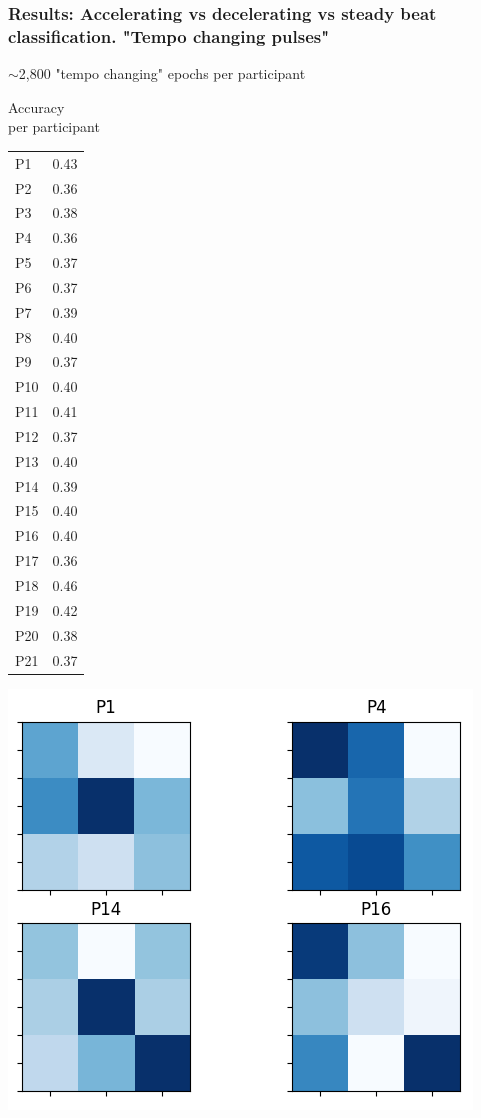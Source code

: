 \documentclass{beamer}
\begin{document}
\begin{frame}
	\frametitle{Results: Accelerating vs decelerating vs steady beat classification. "Tempo changing pulses"}

	$\mathtt{\sim}$2,800 "tempo changing" epochs per participant

	\begin{minipage}{0.3\linewidth}
	Accuracy \\
	per participant
	\begin{table}
	\tiny
	\begin{tabular}{l|l}
		P1 & 0.43 \\
		P2 & 0.36 \\
		P3 & 0.38 \\
		P4 & 0.36 \\
		P5 & 0.37 \\
		P6 & 0.37 \\
		P7 & 0.39 \\
		P8 & 0.40 \\
		P9 & 0.37 \\
		P10 & 0.40 \\
		P11 & 0.41 \\
		P12 & 0.37 \\
		P13 & 0.40 \\
		P14 & 0.39 \\
		P15 & 0.40 \\
		P16 & 0.40 \\
		P17 & 0.36 \\
		P18 & 0.46 \\
		P19 & 0.42 \\
		P20 & 0.38 \\
		P21 & 0.37 \\
	\end{tabular}
	\end{table}
	\end{minipage}
	\begin{minipage}{0.6\linewidth}
		\centering
		\includegraphics[scale=0.6]{fig16.png}
	\end{minipage}

\end{frame}
\end{document}
